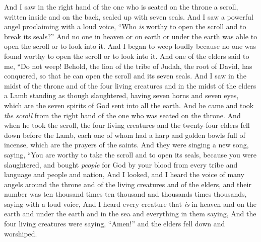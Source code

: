 \begin{biblechapter} %
 And I saw in the right hand of the one who is seated on the throne a scroll, written inside and on the back, sealed up with seven seals.
\verse And I saw a powerful angel proclaiming with a loud voice, “Who \textit{is} worthy to open the scroll and to break its seals?”
\verse And no one in heaven or on earth or under the earth was able to open the scroll or to look into it.
\verse And I began to weep loudly because no one was found worthy to open the scroll or to look into it.
\verse And one of the elders said to me, “Do not weep! Behold, the lion of the tribe of Judah, the root of David, has conquered, so that he can open the scroll and its seven seals.
\verse And I saw in the midst of the throne and of the four living creatures and in the midst of the elders a Lamb standing as though slaughtered, having seven horns and seven eyes, which are the seven spirits of God sent into all the earth.
\verse And he came and took \textit{the scroll} from the right hand of the one who was seated on the throne.
\verse And when he took the scroll, the four living creatures and the twenty-four elders fell down before the Lamb, each one of whom had a harp and golden bowls full of incense, which are the prayers of the saints.
\verse And they were singing a new song, saying,
\verse “You are worthy to take the scroll 
and to open its seals, 
because you were slaughtered, 
and bought \textit{people} for God by your blood 
from every tribe and language and people and nation,
\verse And I looked, and I heard the voice of many angels around the throne and of the living creatures and of the elders, and their number was ten thousand times ten thousand and thousands times thousands,
\verse saying with a loud voice,
\verse And I heard every creature that \textit{is} in heaven and on the earth and under the earth and in the sea and everything in them saying,
\verse And the four living creatures were saying, “Amen!” and the elders fell down and worshiped.
\end{biblechapter}

